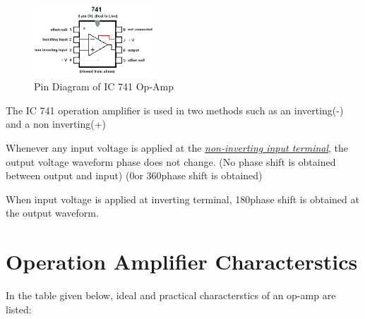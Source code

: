 \documentclass[11pt,a4paper,oneside]{article}
\begin{document}
	\begin{figure}
		\centering
		\includegraphics[width=0.4\textwidth]{images/Pin-Diagram-of-IC-741-removebg-preview.png}
		\caption{Pin Diagram of IC 741 Op-Amp}
	\end{figure}

	The IC 741 operation amplifier is used in two methods such as an inverting(-) and a non inverting(+)

	\noindent Whenever any input voltage is applied at the \emph{\underline{non-inverting input terminal}}, the output voltage waveform phase does not change. (No phase shift is obtained between output and input) (0\degree or 360\degree phase shift is obtained)

	When input voltage is applied at inverting terminal, 180\degree phase shift is obtained at the output waveform.

	\clearpage

	\section{Operation Amplifier Characterstics}

	In the table given below, ideal and practical characterstics of an op-amp are listed:
\end{document}
